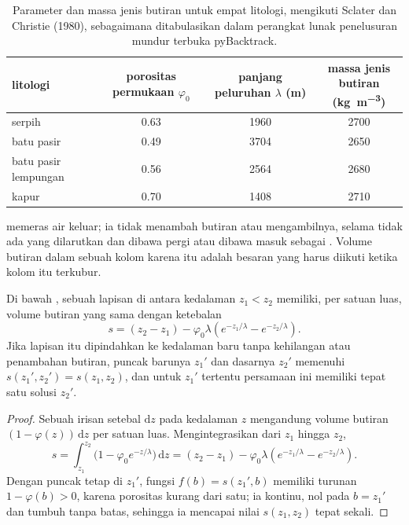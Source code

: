 \begin{table}[htbp]
\centering
\begin{tabular}{lccc}
\hline
litologi & \shortstack{porositas\\permukaan $\varphi_0$} & \shortstack{panjang\\peluruhan $\lambda$ (m)} & \shortstack{massa jenis\\butiran (\unit{kg.m^{-3}})} \\
\hline
serpih            & 0.63 & 1960 & 2700 \\
batu pasir        & 0.49 & 3704 & 2650 \\
batu pasir lempungan  & 0.56 & 2564 & 2680 \\
kapur            & 0.70 & 1408 & 2710 \\
\hline
\end{tabular}
\caption{Parameter  dan massa jenis butiran untuk empat litologi, mengikuti Sclater dan Christie (1980), sebagaimana ditabulasikan dalam perangkat lunak penelusuran mundur terbuka pyBacktrack.}
\label{tab:b1:diagenesis-basins:athy}
\end{table}

 memeras air keluar; ia tidak menambah butiran atau mengambilnya, selama tidak ada yang dilarutkan dan dibawa pergi atau dibawa masuk sebagai . Volume butiran dalam sebuah kolom karena itu adalah besaran yang harus diikuti ketika kolom itu terkubur.

\begin{proposition}\label{prop:b1:diagenesis-basins:solid}
Di bawah , sebuah lapisan di antara kedalaman $z_1 < z_2$ memiliki, per satuan luas, volume butiran yang sama dengan ketebalan
\[
  s = (z_2 - z_1) - \varphi_0 \lambda \left( e^{-z_1/\lambda} - e^{-z_2/\lambda} \right).
\]
Jika lapisan itu dipindahkan ke kedalaman baru tanpa kehilangan atau penambahan butiran, puncak barunya $z_1'$ dan dasarnya $z_2'$ memenuhi $s(z_1', z_2') = s(z_1, z_2)$, dan untuk $z_1'$ tertentu persamaan ini memiliki tepat satu solusi $z_2'$.
\end{proposition}

\begin{proof}
Sebuah irisan setebal $\mathrm dz$ pada kedalaman $z$ mengandung volume butiran $(1 - \varphi(z))\,\mathrm dz$ per satuan luas. Mengintegrasikan dari $z_1$ hingga $z_2$,
\[
  s = \int_{z_1}^{z_2} \bigl(1 - \varphi_0 e^{-z/\lambda}\bigr)\,\mathrm dz
    = (z_2 - z_1) - \varphi_0\lambda\left(e^{-z_1/\lambda} - e^{-z_2/\lambda}\right).
\]
Dengan puncak tetap di $z_1'$, fungsi $f(b) = s(z_1', b)$ memiliki turunan $1 - \varphi(b) > 0$, karena porositas kurang dari satu; ia kontinu, nol pada $b = z_1'$ dan tumbuh tanpa batas, sehingga ia mencapai nilai $s(z_1, z_2)$ tepat sekali.
\end{proof}


